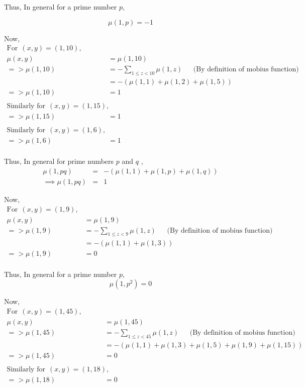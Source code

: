 Thus, In general for a prime number $p$,

$$\mu(1,p) = -1$$

Now,
\begin{align*}
\textrm{For} ~~(x,y) = (1,10),\\
    \mu (x,y) &= \mu (1,10)\\
=>  \mu (1,10) &= -\sum\limits_{1 \le z < 10} \mu(1,z)    ~~~~~~~\textrm{(By definition of mobius function)}\\
    &= - (\mu(1,1) + \mu(1,2) + \mu(1,5)) \\
=>  \mu(1,10) &= 1\\\\
\textrm{Similarly for} ~~(x,y) = (1,15),\\
=> \mu(1,15) &= 1\\\\
\textrm{Similarly for} ~~(x,y) = (1,6),\\
=> \mu(1,6) &= 1\\
\end{align*}

Thus, In general for prime numbers $p$ and $q$ ,
\begin{eqnarray*}
\mu(1,p q) & = & -(\mu(1,1) + \mu(1,p) + \mu(1,q)) \\
\implies \mu(1,p q) & = & 1  
\end{eqnarray*}

\noindent Now,
\begin{align*}
\textrm{For} ~~(x,y) = (1,9),\\
    \mu (x,y) &= \mu (1,9)\\
=>  \mu (1,9) &= -\sum\limits_{1 \le z < 9} \mu(1,z)    ~~~~~~~\textrm{(By definition of mobius function)}\\
    &= - (\mu(1,1) + \mu(1,3)) \\
=>  \mu(1,9) &= 0\\
\end{align*}

Thus, In general for a prime number $p$,
$$\mu(1,p^2) = 0$$

\noindent Now,
\begin{align*}
\textrm{For} ~~(x,y) = (1,45),\\
    \mu (x,y) &= \mu (1,45)\\
=>  \mu (1,45) &= -\sum\limits_{1 \le z < 45} \mu(1,z)    ~~~~~~~\textrm{(By definition of mobius function)}\\
    &= - (\mu(1,1) + \mu(1,3) + \mu(1,5) + \mu(1,9) + \mu(1,15)) \\
=>  \mu(1,45) &= 0\\\\
\textrm{Similarly for} ~~(x,y) = (1,18),\\
=> \mu(1,18) &= 0\\
\end{align*}

